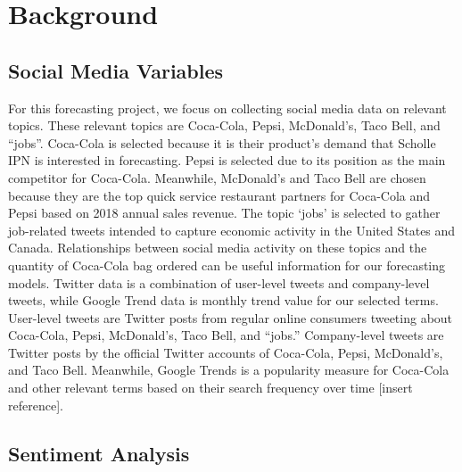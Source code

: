 \documentclass[12pt,oneside]{chicagocapstone}
\begin{document}
\hypertarget{background}{%
\chapter*{Background}\label{background}}

\hypertarget{social-media-variables}{%
\section*{Social Media Variables}\label{social-media-variables}}

For this forecasting project, we focus on collecting social media data on relevant topics. These relevant topics are Coca-Cola, Pepsi, McDonald's, Taco Bell, and ``jobs''. Coca-Cola is selected because it is their product's demand that Scholle IPN is interested in forecasting. Pepsi is selected due to its position as the main competitor for Coca-Cola. Meanwhile, McDonald's and Taco Bell are chosen because they are the top quick service restaurant partners for Coca-Cola and Pepsi based on 2018 annual sales revenue. The topic `jobs' is selected to gather job-related tweets intended to capture economic activity in the United States and Canada. Relationships between social media activity on these topics and the quantity of Coca-Cola bag ordered can be useful information for our forecasting models.
Twitter data is a combination of user-level tweets and company-level tweets, while Google Trend data is monthly trend value for our selected terms. User-level tweets are Twitter posts from regular online consumers tweeting about Coca-Cola, Pepsi, McDonald's, Taco Bell, and ``jobs.'' Company-level tweets are Twitter posts by the official Twitter accounts of Coca-Cola, Pepsi, McDonald's, and Taco Bell. Meanwhile, Google Trends is a popularity measure for Coca-Cola and other relevant terms based on their search frequency over time {[}insert reference{]}.

\hypertarget{sentiment-analysis}{%
\section*{Sentiment Analysis}\label{sentiment-analysis}}
\end{document}
